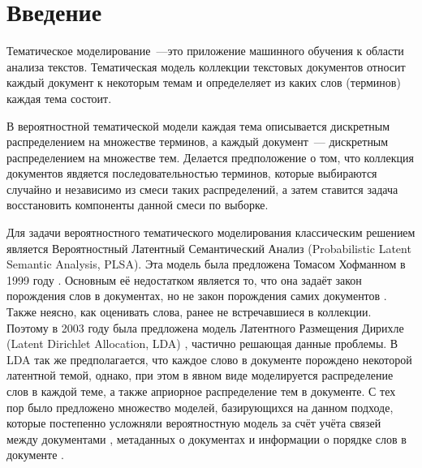 \documentclass[12pt, twoside]{article}
\begin{document}

\maketitle
\linenumbers

\newcommand{\norm}{\mathop{\mathsf{norm}}\limits}

\section{Введение}

Тематическое моделирование~---это приложение машинного обучения к области анализа текстов. Тематическая модель коллекции текстовых документов относит каждый документ к некоторым темам и определеляет из каких слов (терминов) каждая тема состоит.

В вероятностной тематической модели каждая тема описывается дискретным распределением на множестве терминов,  а каждый документ~--- дискретным распределением на множестве тем. Делается предположение о том, что коллекция документов явдяется последовательностью терминов, которые выбираются случайно и независимо из смеси таких распределений, а затем ставится задача восстановить компоненты данной смеси по выборке.

Для  задачи вероятностного тематического моделирования  классическим решением является Вероятностный Латентный Семантический Анализ (Probabilistic Latent Semantic Analysis, PLSA). Эта модель  была предложена Томасом Хофманном в 1999 году \cite{hofmann1999probabilistic}. Основным её недостатком является то, что она задаёт закон порождения слов в документах, но не закон порождения самих документов \cite{daud2010knowledge}. Также  неясно, как оценивать слова, ранее не встречавшиеся в коллекции. Поэтому в 2003 году была предложена модель Латентного Размещения Дирихле (Latent Dirichlet Allocation, LDA) \cite{blei2003latent}, частично решающая данные проблемы. В LDA так же предполагается, что каждое слово в документе порождено некоторой латентной темой, однако, при этом в явном виде моделируется распределение слов в каждой теме, а также априорное
распределение тем в документе. С тех пор было предложено множество моделей, базирующихся на данном подходе, которые постепенно усложняли вероятностную модель за счёт учёта связей между документами \cite{cohn2001missing,mccallum2005author,nallapati2008link}, метаданных о документах \cite{steyvers2004probabilistic} и информации о порядке слов в документе \cite{gruber2007hidden,wallach2006topic}.
\end{document}
